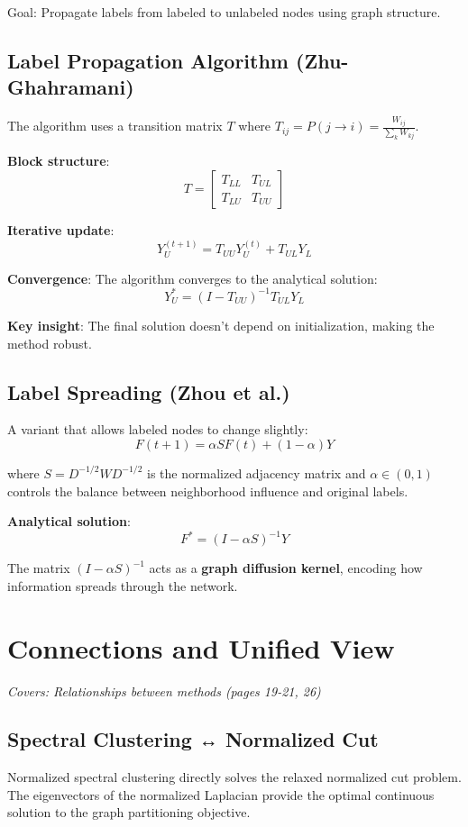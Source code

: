 \documentclass[11pt]{article}
\begin{document}
Goal: Propagate labels from labeled to unlabeled nodes using graph structure.

\subsection{Label Propagation Algorithm (Zhu-Ghahramani)}
The algorithm uses a transition matrix $T$ where $T_{ij} = P(j \to i) = \frac{W_{ij}}{\sum_k W_{kj}}$.

\textbf{Block structure}:
$$T = \begin{bmatrix} T_{LL} & T_{UL} \\ T_{LU} & T_{UU} \end{bmatrix}$$

\textbf{Iterative update}:
$$Y_U^{(t+1)} = T_{UU} Y_U^{(t)} + T_{UL} Y_L$$

\textbf{Convergence}: The algorithm converges to the analytical solution:
$$Y_U^* = (I - T_{UU})^{-1} T_{UL} Y_L$$

\textbf{Key insight}: The final solution doesn't depend on initialization, making the method robust.

\subsection{Label Spreading (Zhou et al.)}
A variant that allows labeled nodes to change slightly:
$$F(t+1) = \alpha S F(t) + (1-\alpha) Y$$

where $S = D^{-1/2}WD^{-1/2}$ is the normalized adjacency matrix and $\alpha \in (0,1)$ controls the balance between neighborhood influence and original labels.

\textbf{Analytical solution}:
$$F^* = (I - \alpha S)^{-1} Y$$

The matrix $(I - \alpha S)^{-1}$ acts as a \textbf{graph diffusion kernel}, encoding how information spreads through the network.

\section{Connections and Unified View}
\textit{Covers: Relationships between methods (pages 19-21, 26)}

\subsection{Spectral Clustering ↔ Normalized Cut}
Normalized spectral clustering directly solves the relaxed normalized cut problem. The eigenvectors of the normalized Laplacian provide the optimal continuous solution to the graph partitioning objective.
\end{document}
